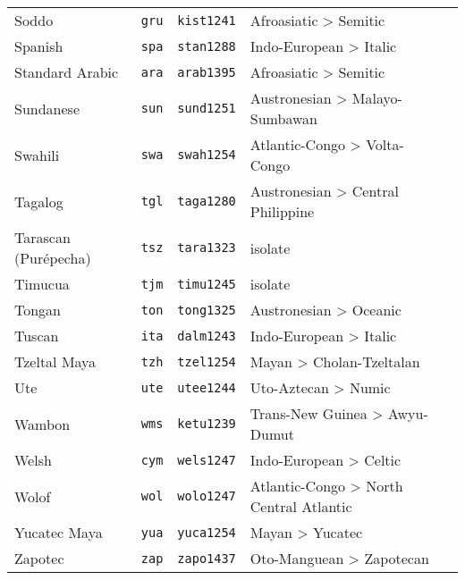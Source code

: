 \begin{longtable}[c]{ l l l l l }
  Soddo                            & \texttt{gru}       & \texttt{kist1241}   & Afroasiatic > Semitic\\
  Spanish                          & \texttt{spa}       & \texttt{stan1288}   & Indo-European > Italic\\
  Standard Arabic                  & \texttt{ara}       & \texttt{arab1395}   & Afroasiatic > Semitic\\
  Sundanese                        & \texttt{sun}       & \texttt{sund1251}   & Austronesian > Malayo-Sumbawan\\
  Swahili                          & \texttt{swa}       & \texttt{swah1254}   & Atlantic-Congo > Volta-Congo\\
  Tagalog                          & \texttt{tgl}       & \texttt{taga1280}   & Austronesian > Central Philippine\\
  Tarascan (Purépecha)             & \texttt{tsz}       & \texttt{tara1323}   & isolate\\
  Timucua                          & \texttt{tjm}       & \texttt{timu1245}   & isolate\\
  Tongan                           & \texttt{ton}       & \texttt{tong1325}   & Austronesian > Oceanic\\
  Tuscan                           & \texttt{ita}       & \texttt{dalm1243}   & Indo-European > Italic\\
  Tzeltal Maya                     & \texttt{tzh}       & \texttt{tzel1254}   & Mayan > Cholan-Tzeltalan\\
  Ute                              & \texttt{ute}       & \texttt{utee1244}   & Uto-Aztecan > Numic\\
  Wambon                           & \texttt{wms}       & \texttt{ketu1239}   & Trans-New Guinea > Awyu-Dumut\\
  Welsh                            & \texttt{cym}       & \texttt{wels1247}   & Indo-European > Celtic\\
  Wolof                            & \texttt{wol}       & \texttt{wolo1247}   & Atlantic-Congo > North Central Atlantic\\
  Yucatec Maya                     & \texttt{yua}       & \texttt{yuca1254}   & Mayan > Yucatec\\
  Zapotec                          & \texttt{zap}       & \texttt{zapo1437}   & Oto-Manguean > Zapotecan\\
\end{longtable}

